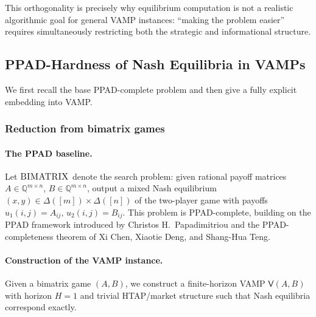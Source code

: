 This orthogonality is precisely why equilibrium computation is not a realistic algorithmic goal for general VAMP instances: ``making the problem easier'' requires simultaneously restricting both the strategic and informational structure.

\subsection{PPAD-Hardness of Nash Equilibria in VAMPs}

We first recall the base PPAD-complete problem and then give a fully explicit embedding into VAMP.

\subsubsection{Reduction from bimatrix games}

\paragraph{The PPAD baseline.}
Let \(\textsc{BIMATRIX}\) denote the search problem: given rational payoff matrices \(A\in\mathbb Q^{m\times n}\), \(B\in\mathbb Q^{m\times n}\), output a mixed Nash equilibrium \((x,y)\in\Delta([m])\times\Delta([n])\) of the two-player game with payoffs \(u_1(i,j)=A_{ij}\), \(u_2(i,j)=B_{ij}\). This problem is PPAD-complete, building on the PPAD framework introduced by Christos H.\ Papadimitriou and the PPAD-completeness theorem of Xi Chen, Xiaotie Deng, and Shang-Hua Teng.

\paragraph{Construction of the VAMP instance.}
Given a bimatrix game \((A,B)\), we construct a finite-horizon VAMP \(\mathsf V(A,B)\) with horizon \(H=1\) and trivial HTAP/market structure such that Nash equilibria correspond exactly.

